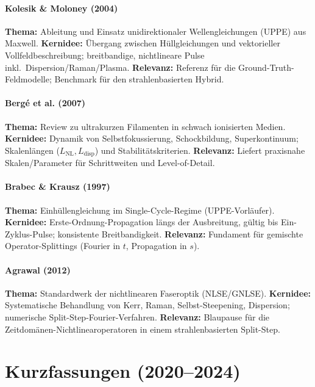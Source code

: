 \paragraph{Kolesik \& Moloney (2004) \cite{kolesik2004nonlinear}}
\textbf{Thema:} Ableitung und Einsatz unidirektionaler Wellengleichungen (UPPE) aus Maxwell. 
\textbf{Kernidee:} Übergang zwischen Hüllgleichungen und vektorieller Vollfeldbeschreibung; breitbandige, nichtlineare Pulse inkl.\ Dispersion/Raman/Plasma. 
\textbf{Relevanz:} Referenz für die Ground-Truth-Feldmodelle; Benchmark für den strahlenbasierten Hybrid.

\paragraph{Bergé et al. (2007) \cite{berge2007ultrashort}}
\textbf{Thema:} Review zu ultrakurzen Filamenten in schwach ionisierten Medien. 
\textbf{Kernidee:} Dynamik von Selbstfokussierung, Schockbildung, Superkontinuum; Skalenlängen (\(L_{\text{NL}}, L_{\text{disp}}\)) und Stabilitätskriterien. 
\textbf{Relevanz:} Liefert praxisnahe Skalen/Parameter für Schrittweiten und Level-of-Detail.

\paragraph{Brabec \& Krausz (1997) \cite{brabec1997singlecycle}}
\textbf{Thema:} Einhüllengleichung im Single-Cycle-Regime (UPPE-Vorläufer). 
\textbf{Kernidee:} Erste-Ordnung-Propagation längs der Ausbreitung, gültig bis Ein-Zyklus-Pulse; konsistente Breitbandigkeit. 
\textbf{Relevanz:} Fundament für gemischte Operator-Splittings (Fourier in \(t\), Propagation in \(s\)).

\paragraph{Agrawal (2012) \cite{agrawal2012nonlinear}}
\textbf{Thema:} Standardwerk der nichtlinearen Faseroptik (NLSE/GNLSE). 
\textbf{Kernidee:} Systematische Behandlung von Kerr, Raman, Selbst-Steepening, Dispersion; numerische Split-Step-Fourier-Verfahren. 
\textbf{Relevanz:} Blaupause für die Zeitdomänen-Nichtlinearoperatoren in einem strahlenbasierten Split-Step.

\section*{Kurzfassungen (2020--2024)}

